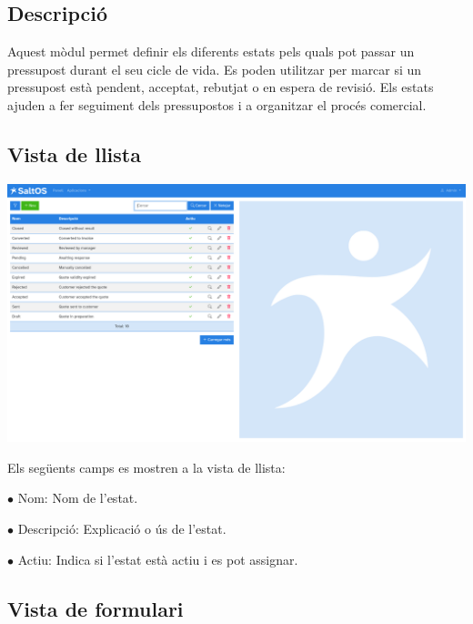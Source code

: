 \documentclass[a4paper]{article}
\begin{document}
\hypertarget{toc77}{}
\subsection{Descripció}

Aquest mòdul permet definir els diferents estats pels quals pot passar un pressupost durant el seu cicle de vida.
Es poden utilitzar per marcar si un pressupost està pendent, acceptat, rebutjat o en espera de revisió.
Els estats ajuden a fer seguiment dels pressupostos i a organitzar el procés comercial.

\hypertarget{toc78}{}
\subsection{Vista de llista}

\begin{center}\includegraphics[width=1\textwidth]{../ujest/snaps/test-screenshots-js-screenshots-crm-quotes-status-list-ca-es-1-snap.png}\end{center}

Els següents camps es mostren a la vista de llista:

\begin{compactitem}
\item[\color{myblue}$\bullet$] Nom: Nom de l'estat.
\item[\color{myblue}$\bullet$] Descripció: Explicació o ús de l'estat.
\item[\color{myblue}$\bullet$] Actiu: Indica si l'estat està actiu i es pot assignar.
\end{compactitem}

\hypertarget{toc79}{}
\subsection{Vista de formulari}
\end{document}

